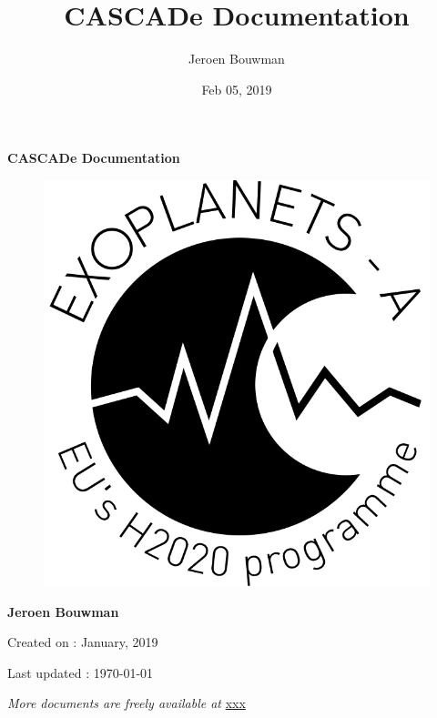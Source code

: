 \documentclass[a4paper,10pt,english]{sphinxmanual}
\title{CASCADe Documentation}
\date{Feb 05, 2019}
\author{Jeroen Bouwman}
\begin{document}
\pagestyle{empty}


        \begin{titlepage}
            \centering

            \vspace*{40mm} %
            \textbf{\Huge {CASCADe Documentation}}

            \vspace{0mm}
            \begin{figure}[!h]
                \centering
                \includegraphics[scale=0.3]{Exoplanets-A_Ecusson_Noir_Alpha.png}
            \end{figure}

            \vspace{0mm}
            \Large \textbf{{Jeroen Bouwman}}

            \small Created on : January, 2019

            \vspace*{0mm}
            \small  Last updated : \MonthYearFormat\today


            \vfill
            \small \textit{More documents are freely available at }{\href{http://xxx.html}{xxx}}
        \end{titlepage}
\end{document}

